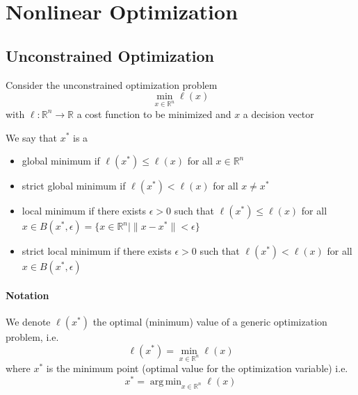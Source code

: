 \documentclass[openany]{book}
\DeclareMathOperator*{\argmin}{arg\,min} %
\newcommand{\R}{\mathbb{R}} %
\theoremstyle{definition}
\theoremstyle{remark}
\begin{document}
\chapter{Nonlinear Optimization}
\section{Unconstrained Optimization}
Consider the unconstrained optimization problem 
\[
    \min_{x\in\R^n}\ell(x)
\]
with $\ell:\R^n\to\R$ a cost function to be minimized and $x$ a decision vector 

We say that $x^*$ is a  
\begin{itemize}
    \item global minimum if $\ell(x^*)\leq\ell(x)$ for all $x\in\R^n$ 
    \item strict global minimum if $\ell(x^*)<\ell(x)$ for all $x\neq x^*$
    \item local minimum if there exists $\epsilon>0$ such that $\ell(x^*)\leq\ell(x)$ for all $x\in B(x^*,\epsilon) = \{x\in\R^n| \|x-x^*\|<\epsilon\}$
    \item strict local minimum if there exists $\epsilon>0$ such that $\ell(x^*)<\ell(x)$ for all $x\in B(x^*,\epsilon)$ 

\end{itemize}
\subsubsection{Notation}
We denote $\ell(x^*)$ the optimal (minimum) value of a generic optimization problem, i.e. 
\[
    \ell(x^*) = \min_{x\in\R^n}\ell(x)
\]
where $x^*$ is the minimum point (optimal value for the optimization variable) i.e. 
\[
    x^* = \argmin_{x\in\R^n} \ell(x)
\]
\end{document}

